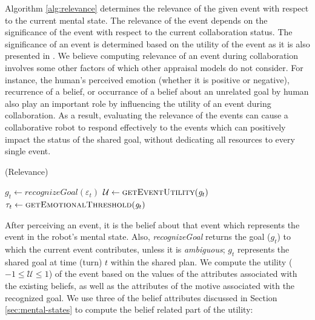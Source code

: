 \documentclass{article}
\begin{document}
Algorithm \ref{alg:relevance} determines the relevance of the given event with
respect to the current mental state. The relevance of the event depends on the
significance of the event with respect to the current collaboration status.
The significance of an event is determined based on the utility of the event as
it is also presented in
\cite{gratch:domain-independent,marsella:ema-process-model}. We believe
computing relevance of an event during collaboration involves some other factors
of which other appraisal models do not consider. For instance, the human's
perceived emotion (whether it is positive or negative), recurrence of a belief,
or occurrance of a belief about an unrelated goal by human also play an
important role by influencing the utility of an event during collaboration. As a
result, evaluating the relevance of the events can cause a collaborative robot
to respond effectively to the events which can positively impact the status of
the shared goal, without dedicating all resources to every single event.

\begin{algorithm}
	\caption{(Relevance)}
	\label{alg:relevance}
	\begin{algorithmic}[1]
			\State $\mathit{g}_{t} \gets \textit{recognizeGoal}{(\varepsilon_t)}$
			\State $\mathcal{U} \gets \Call{getEventUtility}{\mathit{g}_{t}}$ 
			\State $\tau_{t} \gets \Call{getEmotionalThreshold}{\mathit{g}_{t}}$
				\State {}
			\Else
				\State {}
			\EndIf
		\EndFunction
	\end{algorithmic}
\end{algorithm}

\vspace*{-3mm}
After perceiving an event, it is the belief about that event which represents
the event in the robot's mental state. Also, \textit{recognizeGoal} returns
the goal ($g_{t}$) to which the current event contributes, unless it is
\textit{ambiguous}; $g_{t}$ represents the shared goal at time (turn) $t$ within
the shared plan. We compute the utility ($-1 \leq \mathcal{U} \leq 1$) of the
event based on the values of the attributes associated with the existing
beliefs, as well as the attributes of the motive associated with the recognized
goal. We use three of the belief attributes discussed in Section
\ref{sec:mental-states} to compute the belief related part of the utility:
\end{document}
